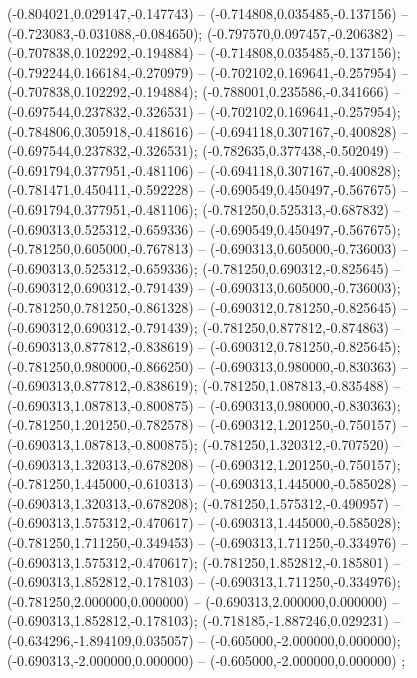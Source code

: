  (-0.804021,0.029147,-0.147743) -- (-0.714808,0.035485,-0.137156) -- (-0.723083,-0.031088,-0.084650);
 (-0.797570,0.097457,-0.206382) -- (-0.707838,0.102292,-0.194884) -- (-0.714808,0.035485,-0.137156);
 (-0.792244,0.166184,-0.270979) -- (-0.702102,0.169641,-0.257954) -- (-0.707838,0.102292,-0.194884);
 (-0.788001,0.235586,-0.341666) -- (-0.697544,0.237832,-0.326531) -- (-0.702102,0.169641,-0.257954);
 (-0.784806,0.305918,-0.418616) -- (-0.694118,0.307167,-0.400828) -- (-0.697544,0.237832,-0.326531);
 (-0.782635,0.377438,-0.502049) -- (-0.691794,0.377951,-0.481106) -- (-0.694118,0.307167,-0.400828);
 (-0.781471,0.450411,-0.592228) -- (-0.690549,0.450497,-0.567675) -- (-0.691794,0.377951,-0.481106);
 (-0.781250,0.525313,-0.687832) -- (-0.690313,0.525312,-0.659336) -- (-0.690549,0.450497,-0.567675);
 (-0.781250,0.605000,-0.767813) -- (-0.690313,0.605000,-0.736003) -- (-0.690313,0.525312,-0.659336);
 (-0.781250,0.690312,-0.825645) -- (-0.690312,0.690312,-0.791439) -- (-0.690313,0.605000,-0.736003);
 (-0.781250,0.781250,-0.861328) -- (-0.690312,0.781250,-0.825645) -- (-0.690312,0.690312,-0.791439);
 (-0.781250,0.877812,-0.874863) -- (-0.690313,0.877812,-0.838619) -- (-0.690312,0.781250,-0.825645);
 (-0.781250,0.980000,-0.866250) -- (-0.690313,0.980000,-0.830363) -- (-0.690313,0.877812,-0.838619);
 (-0.781250,1.087813,-0.835488) -- (-0.690313,1.087813,-0.800875) -- (-0.690313,0.980000,-0.830363);
 (-0.781250,1.201250,-0.782578) -- (-0.690312,1.201250,-0.750157) -- (-0.690313,1.087813,-0.800875);
 (-0.781250,1.320312,-0.707520) -- (-0.690313,1.320313,-0.678208) -- (-0.690312,1.201250,-0.750157);
 (-0.781250,1.445000,-0.610313) -- (-0.690313,1.445000,-0.585028) -- (-0.690313,1.320313,-0.678208);
 (-0.781250,1.575312,-0.490957) -- (-0.690313,1.575312,-0.470617) -- (-0.690313,1.445000,-0.585028);
 (-0.781250,1.711250,-0.349453) -- (-0.690313,1.711250,-0.334976) -- (-0.690313,1.575312,-0.470617);
 (-0.781250,1.852812,-0.185801) -- (-0.690313,1.852812,-0.178103) -- (-0.690313,1.711250,-0.334976);
 (-0.781250,2.000000,0.000000) -- (-0.690313,2.000000,0.000000) -- (-0.690313,1.852812,-0.178103);
 (-0.718185,-1.887246,0.029231) -- (-0.634296,-1.894109,0.035057) -- (-0.605000,-2.000000,0.000000);
 (-0.690313,-2.000000,0.000000) -- (-0.605000,-2.000000,0.000000) ;
